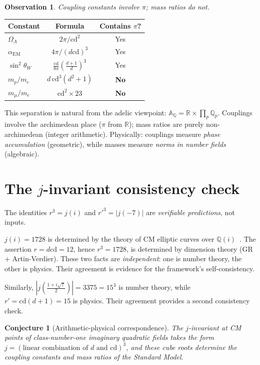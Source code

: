 \documentclass[aps,prl,twocolumn,superscriptaddress,nofootinbib]{revtex4-2}
\newtheorem{observation}[theorem]{Observation}
\newtheorem{conjecture}[theorem]{Conjecture}
\newcommand{\cd}{\mathrm{cd}}
\newcommand{\Q}{\mathbb{Q}}
\begin{document}
\begin{observation}
Coupling constants involve $\pi$; mass ratios do not.
\end{observation}

\begin{center}
\begin{tabular}{lcc}
\toprule
Constant & Formula & Contains $\pi$? \\
\midrule
$\Omega_\Lambda$ & $2\pi/\cd^2$ & Yes \\
$\alpha_{\mathrm{EM}}$ & $4\pi/(d\cd)^3$ & Yes \\
$\sin^2\theta_W$ & $\frac{\cd}{8\pi}(\frac{d+1}{d})^3$ & Yes \\
$m_p/m_e$ & $d\,\cd^3(d^2+1)$ & \textbf{No} \\
$m_\mu/m_e$ & $\cd^2 \times 23$ & \textbf{No} \\
\bottomrule
\end{tabular}
\end{center}

This separation is natural from the adelic viewpoint:
$\mathbb{A}_\Q = \mathbb{R} \times \prod_p \Q_p$.
Couplings involve the archimedean place ($\pi$ from $\mathbb{R}$);
mass ratios are purely non-archimedean (integer arithmetic).
Physically: couplings measure \emph{phase accumulation}
(geometric), while masses measure \emph{norms in number fields}
(algebraic).

\section{The $j$-invariant consistency check}

The identities $r^3 = j(i)$ and ${r'}^3 = |j(-7)|$ are
\emph{verifiable predictions}, not inputs.

$j(i) = 1728$ is determined by the theory of CM elliptic curves
over $\Q(i)$~\cite{Silverman2009}.
The assertion $r = d\cd = 12$, hence $r^3 = 1728$,
is determined by dimension theory (GR + Artin-Verdier).
These two facts are \emph{independent}: one is number theory,
the other is physics. Their agreement is evidence for the
framework's self-consistency.

Similarly, $|j(\tfrac{1+i\sqrt{7}}{2})| = 3375 = 15^3$ is
number theory, while $r' = \cd(d+1) = 15$ is physics.
Their agreement provides a second consistency check.

\begin{conjecture}[Arithmetic-physical correspondence]
The $j$-invariant at CM points of class-number-one imaginary
quadratic fields takes the form $j = (\text{linear combination
of } d \text{ and } \cd)^3$, and these cube roots determine
the coupling constants and mass ratios of the Standard Model.
\end{conjecture}
\end{document}

